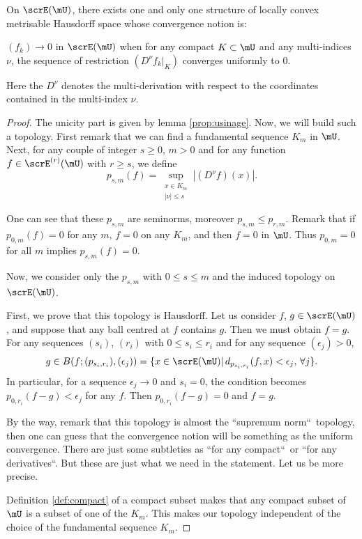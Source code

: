 \begin{proposition}
On $\scrE(\mU)$, there exists one and only one structure of locally convex metrisable Hausdorff space whose convergence notion is:

$(f_k)\to 0$ in $\scrE(\mU)$ when for any compact $K\subset\mU$ and any multi-indices $\nu$, the sequence of restriction $(D^{\nu}f_k|_K)$ converges uniformly to $0$.

Here the $D^{\nu}$ denotes the multi-derivation with respect to the coordinates contained in the multi-index $\nu$.
\label{prop:topo_E}
\end{proposition}
\begin{proof}
 The unicity part is given by lemma \ref{prop:usinage}. Now, we will build such a topology. First remark that we can find a fundamental sequence $K_m$ in $\mU$. Next, for any couple of integer $s\geq 0$, $m>0$ and for any function $f\in\scrE^{(r)}(\mU)$ with $r\geq s$, we define
\[
   p_{s,m}(f)=\sup_{\substack{ x\in K_m\\|\nu|\leq s}}|(D^{\nu}f)(x)|.
\]

One can see that these $p_{s,m}$ are seminorms, moreover $p_{s,m}\leq p_{r,m}$. Remark that if $p_{0,m}(f)=0$ for any $m$, $f=0$ on any $K_m$, and then $f=0$ in $\mU$. Thus $p_{0,m}=0$ for all $m$ implies $p_{s,m}(f)=0$.

Now, we consider only the $p_{s,m}$ with $0\leq s\leq m$ and the induced topology on $\scrE(\mU)$.

First, we prove that this topology is Hausdorff. Let us consider $f$, $g\in\scrE(\mU)$, and suppose that any ball centred at $f$ contains $g$. Then we must obtain $f=g$. For any sequences $(s_i)$, $(r_i)$ with $0\leq s_i\leq r_i$ and for any sequence $(\epsilon_j)>0$,
\[
  g\in B(f;(p_{s_i,r_i}),(\epsilon_j))=
          \{ x\in\scrE(\mU)|\, d_{p_{s_i,r_i}}(f,x)<\epsilon_j,\,\forall j \}.
\]
In particular, for a sequence $\epsilon_j\to 0$ and $s_i=0$, the condition becomes $p_{0,r_i}(f-g)<\epsilon_j$ for any $f$. Then $p_{0,r_i}(f-g)=0$ and $f=g$.

By the way, remark that this topology is almost the ``supremum norm``\ topology, then one can guess that the convergence notion will be something as the uniform convergence. There are just some subtleties as ``for any compact``\ or ``for any derivatives``. But these are just what we need in the statement. Let us be more precise.

Definition \ref{def:compact} of a compact subset makes that any compact subset of $\mU$ is a subset of one of the $K_m$. This makes our topology independent of the choice of the fundamental sequence $K_m$.


\end{proof}
